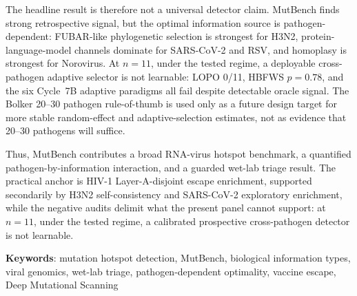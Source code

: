 The headline result is therefore not a universal detector claim. MutBench finds strong retrospective signal, but the optimal information source is pathogen-dependent: FUBAR-like phylogenetic selection is strongest for H3N2, protein-language-model channels dominate for SARS-CoV-2 and RSV, and homoplasy is strongest for Norovirus. At $n=11$, under the tested regime, a deployable cross-pathogen adaptive selector is not learnable: LOPO 0/11, HBFWS $p = 0.78$, and the six Cycle~7B adaptive paradigms all fail despite detectable oracle signal. The Bolker 20--30 pathogen rule-of-thumb is used only as a future design target for more stable random-effect and adaptive-selection estimates, not as evidence that 20--30 pathogens will suffice.

Thus, MutBench contributes a broad RNA-virus hotspot benchmark, a quantified pathogen-by-information interaction, and a guarded wet-lab triage result. The practical anchor is HIV-1 Layer-A-disjoint escape enrichment, supported secondarily by H3N2 self-consistency and SARS-CoV-2 exploratory enrichment, while the negative audits delimit what the present panel cannot support: at $n=11$, under the tested regime, a calibrated prospective cross-pathogen detector is not learnable.

\vspace{1em}
\noindent\textbf{Keywords}: mutation hotspot detection, MutBench, biological information types, viral genomics, wet-lab triage, pathogen-dependent optimality, vaccine escape, Deep Mutational Scanning
